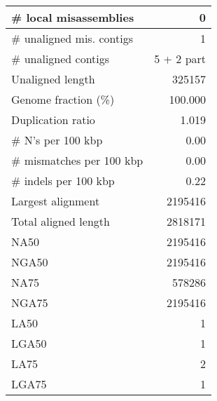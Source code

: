 \documentclass[12pt,a4paper]{article}
\begin{document}
\begin{table}[ht]
\begin{center}
\begin{tabular}{|l*{1}{|r}|}
\# local misassemblies & 0 \\ \hline
\# unaligned mis. contigs & 1 \\ \hline
\# unaligned contigs & 5 + 2 part \\ \hline
Unaligned length & 325157 \\ \hline
Genome fraction (\%) & 100.000 \\ \hline
Duplication ratio & 1.019 \\ \hline
\# N's per 100 kbp & 0.00 \\ \hline
\# mismatches per 100 kbp & 0.00 \\ \hline
\# indels per 100 kbp & 0.22 \\ \hline
Largest alignment & 2195416 \\ \hline
Total aligned length & 2818171 \\ \hline
NA50 & 2195416 \\ \hline
NGA50 & 2195416 \\ \hline
NA75 & 578286 \\ \hline
NGA75 & 2195416 \\ \hline
LA50 & 1 \\ \hline
LGA50 & 1 \\ \hline
LA75 & 2 \\ \hline
LGA75 & 1 \\ \hline
\end{tabular}
\end{center}
\end{table}
\end{document}
